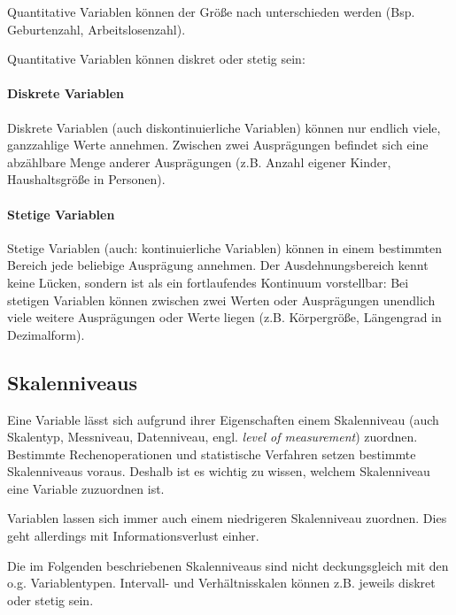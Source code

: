 \documentclass[
  11pt,
  ngerman,
  a4paper,
]{report}
\begin{document}
Quantitative Variablen können der Größe nach unterschieden werden (Bsp. Geburtenzahl, Arbeitslosenzahl).

Quantitative Variablen können diskret oder stetig sein:

\hypertarget{diskrete-variablen}{%
\paragraph{Diskrete Variablen}\label{diskrete-variablen}}

Diskrete Variablen (auch diskontinuierliche Variablen) können nur endlich viele, ganzzahlige Werte annehmen. Zwischen zwei Ausprägungen befindet sich eine abzählbare Menge anderer Ausprägungen (z.B. Anzahl eigener Kinder, Haushaltsgröße in Personen).

\hypertarget{stetige-variablen}{%
\paragraph{Stetige Variablen}\label{stetige-variablen}}

Stetige Variablen (auch: kontinuierliche Variablen) können in einem bestimmten Bereich jede beliebige Ausprägung annehmen. Der Ausdehnungsbereich kennt keine Lücken, sondern ist als ein fortlaufendes Kontinuum vorstellbar: Bei stetigen Variablen können zwischen zwei Werten oder Ausprägungen unendlich viele weitere Ausprägungen oder Werte liegen (z.B. Körpergröße, Längengrad in Dezimalform).

\hypertarget{skalenniveaus}{%
\subsection{Skalenniveaus}\label{skalenniveaus}}

Eine Variable lässt sich aufgrund ihrer Eigenschaften einem Skalenniveau (auch Skalentyp, Messniveau, Datenniveau, engl. \emph{level of measurement}) zuordnen. Bestimmte Rechenoperationen und statistische Verfahren setzen bestimmte Skalenniveaus voraus. Deshalb ist es wichtig zu wissen, welchem Skalenniveau eine Variable zuzuordnen ist.

Variablen lassen sich immer auch einem niedrigeren Skalenniveau zuordnen. Dies geht allerdings mit Informationsverlust einher.

Die im Folgenden beschriebenen Skalenniveaus sind nicht deckungsgleich mit den o.g. Variablentypen. Intervall- und Verhältnisskalen können z.B. jeweils diskret oder stetig sein.
\end{document}
